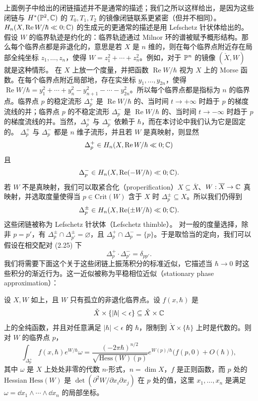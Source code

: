 上面例子中给出的闭链描述并不是通常的描述；我们之所以这样给出，是因为这些闭链与 $H^*(\mathbb{P}^2,\mathbb{C})$ 的 $T_0,T_1,T_2$ 的镜像闭链联系更紧密（但并不相同）。$H_n(X,\operatorname{Re}W/\hbar\ll0;\mathbb{C})$ 的生成元的更通常的描述是用 Lefschetz 针状体给出的。
假设 $W$ 的临界轨迹是约化的：临界轨迹通过 Milnor 环的谱被赋予概形结构。那么每个临界点都是非退化的，意思是若 $X$ 是 $n$ 维的，则在每个临界点附近存在局部全纯坐标 $z_1,\dots,z_n$，使得 $W=z_1^2+\cdots+z_n^2$。例如，对于 $\mathbb{P}^n$ 的镜像 $(\check X,W)$ 就是这种情形。
在 $X$ 上放一个度量，并把函数 $\operatorname{Re}W/\hbar$ 视为 $X$ 上的 Morse 函数。在每个临界点附近局部地，存在实坐标 $y_1,\dots,y_{2n}$，使得
$\operatorname{Re}W/\hbar=y_1^2+\cdots+y_n^2-y_{n+1}^2-\cdots-y_{2n}^2$。所以每个临界点都是指标为 $n$ 的临界点。临界点 $p$ 的稳定流形 $\Delta_p^+$ 是 $\operatorname{Re}W/\hbar$ 的、当时间 $t\to+\infty$ 时趋于 $p$ 的梯度流线的并；临界点 $p$ 的不稳定流形 $\Delta_p^-$ 是 $\operatorname{Re}W/\hbar$ 的、当时间 $t\to-\infty$ 时趋于 $p$ 的梯度流线的并。当然，$\Delta_p^+$ 与 $\Delta_p^-$ 依赖于 $\hbar$，而在本讨论中我们认为它是固定的。
$\Delta_p^+$ 与 $\Delta_p^-$ 都是 $n$ 维子流形，并且若 $W$ 是真映射，则显然
\[
\Delta_p^+\in H_n(X,\operatorname{Re}W/\hbar\ll0;\mathbb{C})
\]
且
\[
\Delta_p^-\in H_n(X,\operatorname{Re}(-W/\hbar)\ll0;\mathbb{C}).
\]
若 $W$ 不是真映射，我们可以取紧合化（properification）$X\subseteq\overline{X}$、$W:\overline{X}\to\mathbb{C}$ 真映射，并选取度量使得当 $p\in\mathrm{Crit}(W)$ 含于 $X$ 时 $\Delta_p^{\pm}\subseteq X$。所以我们仍得到
\[
\Delta_p^{\pm}\in H_n(X,\operatorname{Re}(\pm W/\hbar)\ll0;\mathbb{C}).
\]
这些闭链被称为 Lefschetz 针状体（Lefschetz thimble）。
对一般的度量选择，除非 $p=p'$，有 $\Delta_p^{\pm}\cap\Delta_{p'}^{\pm}=\varnothing$，且 $\Delta_p^+\cap\Delta_p^-=\{p\}$。于是取恰当的定向，我们可以假设在相交配对 (2.25) 下
\begin{equation}
\Delta_p^+\cdot\Delta_{p'}^-=\delta_{pp'}. \tag{2.26}
\end{equation}
我们将需要下面这个关于这些闭链上振荡积分的标准近似，它描述当 $\hbar\to0$ 时这些积分的渐近行为。这一近似被称为平稳相位近似（stationary phase approximation）：

\begin{proposition}
设 $X,W$ 如上，且 $W$ 只有孤立的非退化临界点。设 $f(x,\hbar)$ 是
\[
\check X\times\{|\hbar|<\epsilon\}\subseteq\check X\times\mathbb{C}
\]
上的全纯函数，并且对任意满足 $|\hbar|<\epsilon$ 的 $\hbar$，限制到 $\check X\times\{\hbar\}$ 上时是代数的。则对 $W$ 的临界点 $p$，
\[
\int_{\Delta_p^+}f(x,\hbar)e^{W/\hbar}\omega=\frac{(-2\pi\hbar)^{n/2}}{\sqrt{\mathrm{Hess}(W)(p)}}e^{W(p)/\hbar}\bigl(f(p,0)+O(\hbar)\bigr),
\]
其中 $\omega$ 是 $X$ 上处处非零的代数 $n$-形式，$n=\dim X$，$f$ 是正则函数，而 $p$ 处的 Hessian $\mathrm{Hess}(W)$ 是 $\det(\partial^2W/\partial x_i\partial x_j)$ 在 $p$ 处的值，这里 $x_1,\dots,x_n$ 是满足 $\omega=\dd x_1\wedge\cdots\wedge\dd x_n$ 的局部坐标。
\end{proposition}

